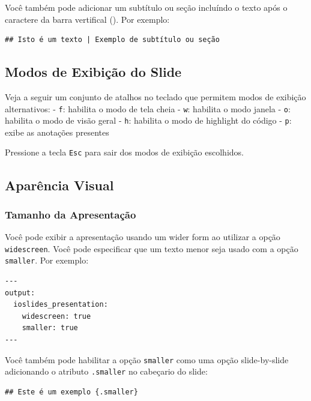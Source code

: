 \documentclass[
]{book}
\begin{document}
Você também pode adicionar um subtítulo ou seção incluíndo o texto após o caractere da barra vertifical (\texttt{\textbar{}}). Por exemplo:

\begin{verbatim}
## Isto é um texto | Exemplo de subtítulo ou seção
\end{verbatim}

\hypertarget{modos-de-exibiuxe7uxe3o-do-slide}{%
\subsection{Modos de Exibição do Slide}\label{modos-de-exibiuxe7uxe3o-do-slide}}

Veja a seguir um conjunto de atalhos no teclado que permitem modos de exibição alternativos:
- \texttt{f}: habilita o modo de tela cheia
- \texttt{w}: habilita o modo janela
- \texttt{o}: habilita o modo de visão geral
- \texttt{h}: habilita o modo de highlight do código
- \texttt{p}: exibe as anotações presentes

Pressione a tecla \texttt{Esc} para sair dos modos de exibição escolhidos.

\hypertarget{aparuxeancia-visual}{%
\subsection{Aparência Visual}\label{aparuxeancia-visual}}

\hypertarget{tamanho-da-apresentauxe7uxe3o}{%
\subsubsection*{Tamanho da Apresentação}\label{tamanho-da-apresentauxe7uxe3o}}

Você pode exibir a apresentação usando um wider form ao utilizar a opção \texttt{widescreen}. Você pode especificar que um texto menor seja usado com a opção \texttt{smaller}. Por exemplo:

\begin{verbatim}
---
output:
  ioslides_presentation:
    widescreen: true
    smaller: true
---
\end{verbatim}

Você também pode habilitar a opção \texttt{smaller} como uma opção slide-by-slide adicionando o atributo \texttt{.smaller} no cabeçario do slide:

\begin{verbatim}
## Este é um exemplo {.smaller}
\end{verbatim}
\end{document}
